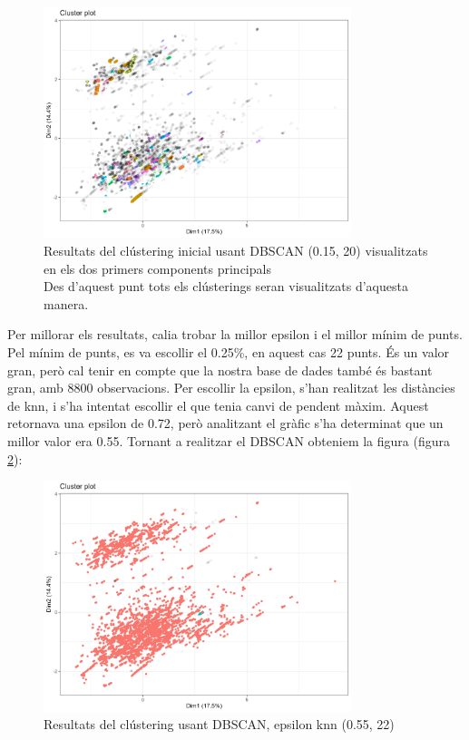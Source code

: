 \documentclass{article}
\begin{document}
\begin{figure}[H]
    \centering
    \includegraphics[width=0.8\textwidth]{Images/4_clustering/DBSCAN/baddbscan.png}
    \caption{Resultats del clústering inicial usant DBSCAN (0.15, 20) visualitzats en els dos primers components principals \\
    Des d'aquest punt tots els clústerings seran visualitzats d'aquesta manera.}
    \label{fig:DBSCAN_inicial}
\end{figure}


Per millorar els resultats, calia trobar la millor epsilon i el millor mínim de punts. Pel mínim de punts, es va escollir el 0.25\%, en aquest cas 22 punts. És un valor gran, però cal tenir en compte que la nostra base de dades també és bastant gran, amb 8800 observacions. Per escollir la epsilon, s'han realitzat les distàncies de knn, i s'ha intentat escollir el que tenia canvi de pendent màxim. Aquest retornava una epsilon de 0.72, però analitzant el gràfic s'ha determinat que un millor valor era 0.55. Tornant a realitzar el DBSCAN obteniem la figura  (figura \ref{fig:DBSCAN_auto}):

\begin{figure}[H]
    \centering
    \includegraphics[width=0.8\textwidth]{Images/4_clustering/DBSCAN/dbscanauto.png}
    \caption{Resultats del clústering usant DBSCAN, epsilon knn (0.55, 22)}
    \label{fig:DBSCAN_auto}
\end{figure}
\end{document}
